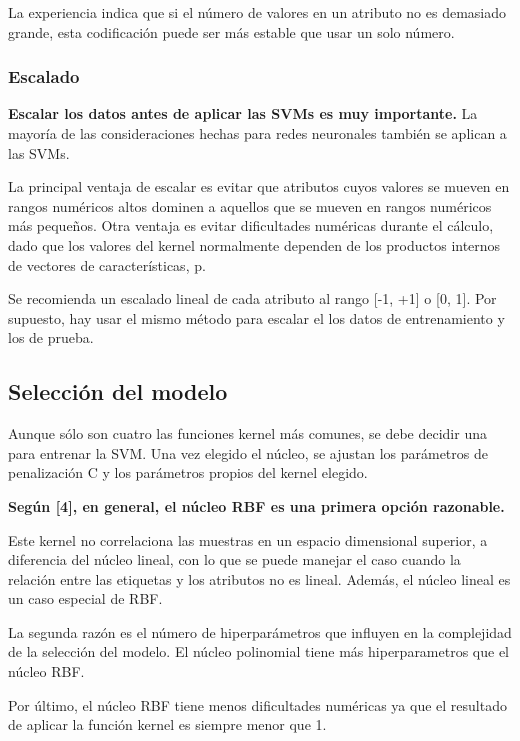 \documentclass[11pt]{article}
\begin{document}
La experiencia indica que si el número de valores en un atributo no es
demasiado grande, esta codificación puede ser más estable que usar un
solo número.

\subsubsection{Escalado}\label{escalado}

\textbf{Escalar los datos antes de aplicar las SVMs es muy importante.}
La mayoría de las consideraciones hechas para redes neuronales también
se aplican a las SVMs.

La principal ventaja de escalar es evitar que atributos cuyos valores se
mueven en rangos numéricos altos dominen a aquellos que se mueven en
rangos numéricos más pequeños. Otra ventaja es evitar dificultades
numéricas durante el cálculo, dado que los valores del kernel
normalmente dependen de los productos internos de vectores de
características, p.

Se recomienda un escalado lineal de cada atributo al rango {[}-1, +1{]}
o {[}0, 1{]}. Por supuesto, hay usar el mismo método para escalar el los
datos de entrenamiento y los de prueba.

\subsection{Selección del modelo}\label{selecciuxf3n-del-modelo}

Aunque sólo son cuatro las funciones kernel más comunes, se debe decidir
una para entrenar la SVM. Una vez elegido el núcleo, se ajustan los
parámetros de penalización C y los parámetros propios del kernel
elegido.

\textbf{Según {[}4{]}, en general, el núcleo RBF es una primera opción
razonable.}

Este kernel no correlaciona las muestras en un espacio dimensional
superior, a diferencia del núcleo lineal, con lo que se puede manejar el
caso cuando la relación entre las etiquetas y los atributos no es
lineal. Además, el núcleo lineal es un caso especial de RBF.

La segunda razón es el número de hiperparámetros que influyen en la
complejidad de la selección del modelo. El núcleo polinomial tiene más
hiperparametros que el núcleo RBF.

Por último, el núcleo RBF tiene menos dificultades numéricas ya que el
resultado de aplicar la función kernel es siempre menor que 1.
\end{document}

